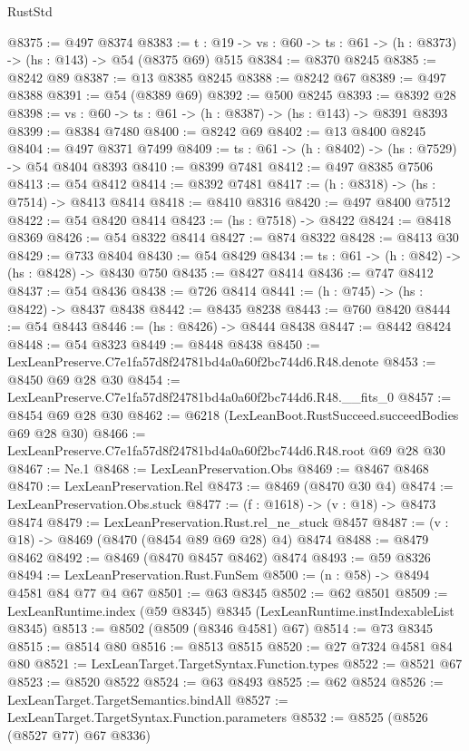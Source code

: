 \begin{lexlean}{RustStd}
\begin{coremodule}
@8375 := @497 @8374
@8383 := {t : @19} -> {vs : @60} -> {ts : @61} -> (h : @8373) -> (hs : @143) -> @54 (@8375 @69) @515
@8384 := @8370 @8245
@8385 := @8242 @89
@8387 := @13 @8385 @8245
@8388 := @8242 @67
@8389 := @497 @8388
@8391 := @54 (@8389 @69)
@8392 := @500 @8245
@8393 := @8392 @28
@8398 := {vs : @60} -> {ts : @61} -> (h : @8387) -> (hs : @143) -> @8391 @8393
@8399 := @8384 @7480
@8400 := @8242 @69
@8402 := @13 @8400 @8245
@8404 := @497 @8371 @7499
@8409 := {ts : @61} -> (h : @8402) -> (hs : @7529) -> @54 @8404 @8393
@8410 := @8399 @7481
@8412 := @497 @8385 @7506
@8413 := @54 @8412
@8414 := @8392 @7481
@8417 := (h : @8318) -> (hs : @7514) -> @8413 @8414
@8418 := @8410 @8316
@8420 := @497 @8400 @7512
@8422 := @54 @8420 @8414
@8423 := (hs : @7518) -> @8422
@8424 := @8418 @8369
@8426 := @54 @8322 @8414
@8427 := @874 @8322
@8428 := @8413 @30
@8429 := @733 @8404
@8430 := @54 @8429
@8434 := {ts : @61} -> (h : @842) -> (hs : @8428) -> @8430 @750
@8435 := @8427 @8414
@8436 := @747 @8412
@8437 := @54 @8436
@8438 := @726 @8414
@8441 := (h : @745) -> (hs : @8422) -> @8437 @8438
@8442 := @8435 @8238
@8443 := @760 @8420
@8444 := @54 @8443
@8446 := (hs : @8426) -> @8444 @8438
@8447 := @8442 @8424
@8448 := @54 @8323
@8449 := @8448 @8438
@8450 := LexLeanPreserve.C7e1fa57d8f24781bd4a0a60f2bc744d6.R48.denote
@8453 := @8450 @69 @28 @30
@8454 := LexLeanPreserve.C7e1fa57d8f24781bd4a0a60f2bc744d6.R48.__fits_0
@8457 := @8454 @69 @28 @30
@8462 := @6218 (LexLeanBoot.RustSucceed.succeedBodies @69 @28 @30)
@8466 := LexLeanPreserve.C7e1fa57d8f24781bd4a0a60f2bc744d6.R48.root @69 @28 @30
@8467 := Ne.{1}
@8468 := LexLeanPreservation.Obs
@8469 := @8467 @8468
@8470 := LexLeanPreservation.Rel
@8473 := @8469 (@8470 @30 @4)
@8474 := LexLeanPreservation.Obs.stuck
@8477 := (f : @1618) -> (v : @18) -> @8473 @8474
@8479 := LexLeanPreservation.Rust.rel_ne_stuck @8457
@8487 := (v : @18) -> @8469 (@8470 (@8454 @89 @69 @28) @4) @8474
@8488 := @8479 @8462
@8492 := @8469 (@8470 @8457 @8462) @8474
@8493 := @59 @8326
@8494 := LexLeanPreservation.Rust.FunSem
@8500 := (n : @58) -> @8494 @4581 @84 @77 @4 @67
@8501 := @63 @8345
@8502 := @62 @8501
@8509 := LexLeanRuntime.index (@59 @8345) @8345 (LexLeanRuntime.instIndexableList @8345)
@8513 := @8502 (@8509 (@8346 @4581) @67)
@8514 := @73 @8345
@8515 := @8514 @80
@8516 := @8513 @8515
@8520 := @27 @7324 @4581 @84 @80
@8521 := LexLeanTarget.TargetSyntax.Function.types
@8522 := @8521 @67
@8523 := @8520 @8522
@8524 := @63 @8493
@8525 := @62 @8524
@8526 := LexLeanTarget.TargetSemantics.bindAll
@8527 := LexLeanTarget.TargetSyntax.Function.parameters
@8532 := @8525 (@8526 (@8527 @77) @67 @8336)

\end{coremodule}
\end{lexlean}
